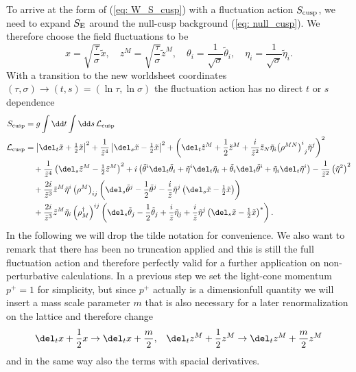 %
%
To arrive at the form of (\ref{eq: W_S_cusp}) with a fluctuation action $S_{\rm cusp}$, we need to expand $S_{\rm E}$ around the null-cusp background (\ref{eq: null_cusp}). We therefore choose the field fluctuations to be
%
%
\begin{equation}
x=\sqrt{\frac{\tau}{\sigma}}\tilde{x}, \quad z^{M}=\sqrt{\frac{\tau}{\sigma}}\tilde{z}^{M}, \quad \theta_{i}=\frac{1}{\sqrt{\sigma}}\tilde{\theta}_{i}, \quad \eta_{i} = \frac{1}{\sqrt{\sigma}}\tilde{\eta}_{i}.
\end{equation}
%
%
With a transition to the new worldsheet coordinates ${(\tau,\sigma)\to (t,s)=(\ln\tau , \ln \sigma)}$ the fluctuation action has no direct $t$ or $s$ dependence
%
%
\begin{align}
S_{\rm cusp} &= g \int \dd t \int \dd s \, \mathcal{L}_{\rm cusp} \label{eq: cusp_action} \\
%
%
\mathcal{L}_{\rm cusp} &= \left\vert \del_{t}\tilde{x} + \tfrac{1}{2}\tilde{x} \right\vert^{2} + \frac{1}{\tilde{z}^{4}}\left\vert \del_{s}\tilde{x} - \tfrac{1}{2}\tilde{x} \right\vert^{2} + \left( \del_{t}\tilde{z}^{M} + \frac{1}{2}\tilde{z}^{M} + \frac{i}{\tilde{z}^{2}}\tilde{z}_{N}\tilde{\eta}_{i} {\left(\rho^{MN}\right)^{i}}_{j} \tilde{\eta}^{j}\right)^{2} \notag \\
%
%
&\quad +\frac{1}{\tilde{z}^{4}}\left( \del_{s}\tilde{z}^{M} - \tfrac{1}{2} \tilde{z}^{M}\right)^{2} + i \left( \tilde{\theta}^{i}\del_{t}\tilde{\theta}_{i} + \tilde{\eta}^{i}\del_{t}\tilde{\eta}_{i} + \tilde{\theta}_{i}\del_{t}\tilde{\theta}^{i} + \tilde{\eta}_{i}\del_{t}\tilde{\eta}^{i}\right) - \frac{1}{\tilde{z}^{2}}\left(\tilde{\eta}^{2}\right)^{2} \notag \\
%
%
&\quad + \frac{2i}{\tilde{z}^{3}}\tilde{z}^{M}\tilde{\eta}^{i} \left(\rho^{M}\right)_{ij} \left( \del_{s}\tilde{\theta}^{j} - \frac{1}{2}\tilde{\theta}^{j} - \frac{i}{\tilde{z}} \tilde{\eta}^{j} \left(\del_{s}\tilde{x}- \tfrac{1}{2}\tilde{x}\right)\right) \notag \\
%
%
&\quad + \frac{2i}{\tilde{z}^{3}}\tilde{z}^{M}\tilde{\eta}_{i}\left(\rho_{M}^{\dagger}\right)^{ij} \left( \del_{s}\tilde{\theta}_{j} - \frac{1}{2} \tilde{\theta}_{j} + \frac{i}{\tilde{z}}\tilde{\eta}_{j} + \frac{i}{\tilde{z}} \tilde{\eta}^{j} \left(\del_{s}\tilde{x}- \tfrac{1}{2}\tilde{x}\right)^{*} \right). \notag
\end{align}
%
%
In the following we will drop the tilde notation for convenience. We also want to remark that there has been no truncation applied and this is still the full fluctuation action and therefore perfectly valid for a further application on non-perturbative calculations. In a previous step we set the light-cone momentum $p^{+}=1$ for simplicity, but since $p^{+}$ actually is a dimensionfull quantity we will insert a mass scale parameter $m$ that is also necessary for a later renormalization on the lattice and therefore change
%
%
\begin{align}
\del_{t}x +\frac{1}{2}x &\to \del_{t}x +\frac{m}{2}, & \del_{t}z^{M}+\frac{1}{2}z^{M} \to \del_{t}z^{M}+\frac{m}{2}z^{M}
\end{align}
%
%
and in the same way also the terms with spacial derivatives.
%
%
%
%
%
%
%
%
%
